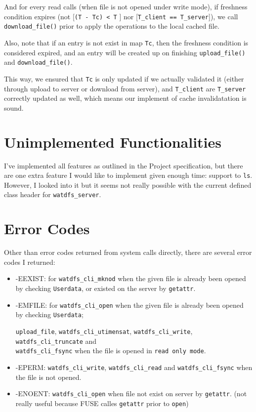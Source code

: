 \documentclass[11pt,a4paper]{article}
\begin{document}
And for every read calls (when file is not opened under write mode), if freshness condition expires (not [\texttt{(T - Tc) < T} ] nor [\texttt{T\_client == T\_server}]), we call \texttt{download\_file()} prior to apply the operations to the local cached file.

Also, note that if an entry is not exist in map \texttt{Tc}, then the freshness condition is considered expired, and an entry will be created up on finishing \texttt{upload\_file()} and \texttt{download\_file()}.

This way, we ensured that \texttt{Tc} is only updated if we actually validated it (either through upload to server or download from server), and \texttt{T\_client} are \texttt{T\_server} correctly updated as well, which means our implement of cache invalidatation is sound.
 
\section{Unimplemented Functionalities}

I've implemented all features as outlined in the Project specification, but there are one extra feature I would like to implement given enough time: support to \texttt{ls}. However, I looked into it but it seems not really possible with the current defined class header for \texttt{watdfs\_server}.

\section{Error Codes}
Other than error codes returned from system calls directly, there are several error codes I returned:

\begin{itemize}
	\item{-EEXIST}: for \texttt{watdfs\_cli\_mknod} when the given file is already been opened by checking \texttt{Userdata}, or existed on the server by \texttt{getattr}.
	\item{-EMFILE}: for \texttt{watdfs\_cli\_open} when the given file is already been opened by checking \texttt{Userdata}; 
	
	\texttt{upload\_file}, \texttt{watdfs\_cli\_utimensat}, \texttt{watdfs\_cli\_write}, \texttt{watdfs\_cli\_truncate} and\\ \texttt{watdfs\_cli\_fsync} when the file is opened in \texttt{read only mode}.
	
	\item{-EPERM}: \texttt{watdfs\_cli\_write}, \texttt{watdfs\_cli\_read} and \texttt{watdfs\_cli\_fsync} when the file is not opened.
	
	\item{-ENOENT}: \texttt{watdfs\_cli\_open} when file not exist on server by \texttt{getattr}. (not really useful because FUSE calles \texttt{getattr} prior to \texttt{open})
\end{itemize}
\end{document}
